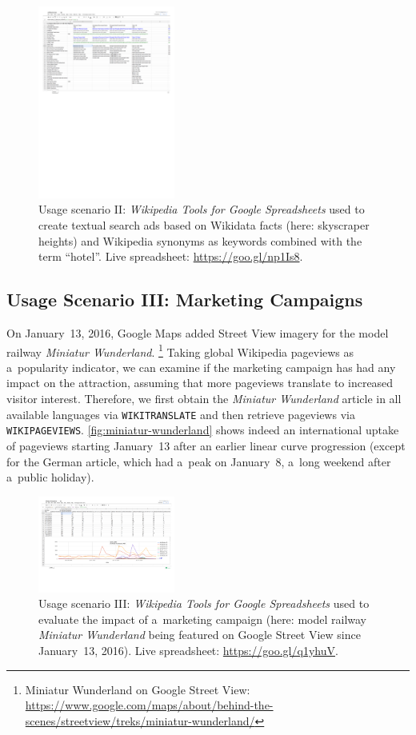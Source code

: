 \documentclass{sig-alternate-05-2015}
\newcommand{\inlinelistingsize}{\fontsize{8pt}{11pt}}
\let\oldurl\url
\renewcommand{\url}[1]{\inlinelistingsize\oldurl{#1}}
\begin{document}
\begin{figure}[p!]
  \centering
  \includegraphics[width=0.4\textwidth]{adwords-ads}
  \caption{Usage scenario II: \emph{Wikipedia Tools for Google Spreadsheets} used to create textual search ads based on Wikidata facts (here: skyscraper heights) and Wikipedia synonyms as keywords combined with the term ``hotel''. Live spreadsheet: \url{https://goo.gl/np1Is8}.}
  \label{fig:adwords-ads}
\end{figure}

\subsection{Usage Scenario III: Marketing Campaigns}

On January~13, 2016, Google Maps added Street View imagery for the model railway \emph{Miniatur Wunderland}.%
\footnote{Miniatur Wunderland on Google Street View:
\url{https://www.google.com/maps/about/behind-the-scenes/streetview/treks/miniatur-wunderland/}}
Taking global Wikipedia pageviews as a~popularity indicator,
we can examine if the marketing campaign has had any impact on the attraction,
assuming that more pageviews translate to increased visitor interest.
Therefore, we first obtain the \emph{Miniatur Wunderland} article in all available languages
via \texttt{WIKITRANSLATE} and then retrieve pageviews via \texttt{WIKIPAGEVIEWS}.
\autoref{fig:miniatur-wunderland} shows indeed an international uptake of pageviews
starting January~13 after an earlier linear curve progression
(except for the German article, which had a~peak on January~8, a~long weekend after a~public holiday).

\begin{figure}[p!]
  \centering
  \includegraphics[width=0.4\textwidth]{miniatur-wunderland}
  \caption{Usage scenario III: \emph{Wikipedia Tools for Google Spreadsheets} used to evaluate the impact of a~marketing campaign (here: model railway \emph{Miniatur Wunderland} being featured on Google Street View since January~13, 2016). Live spreadsheet: \url{https://goo.gl/q1yhuV}.}
  \label{fig:miniatur-wunderland}
\end{figure}
\end{document}
